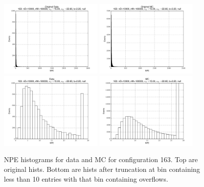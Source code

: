  \begin{figure}[htbp] \begin{center} 
\includegraphics[width=0.45\textwidth]{../FIGURES/163/FIG_Original_Data.pdf} 
\includegraphics[width=0.45\textwidth]{../FIGURES/163/FIG_Original_MC.pdf} 
\includegraphics[width=0.45\textwidth]{../FIGURES/163/FIG_Data.pdf} 
\includegraphics[width=0.45\textwidth]{../FIGURES/163/FIG_MC.pdf} 
\caption{NPE histograms for data and MC for configuration 163. Top are original hists. Bottom are hists after truncation at bin containing less than 10 entries with that bin containing overflows.} 
\label{tab:npe_163} 
\end{center} \end{figure} 
\clearpage
 
